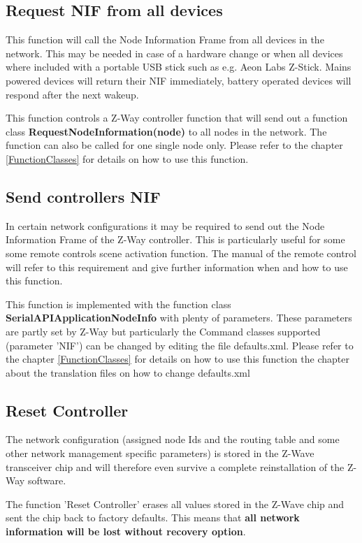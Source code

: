 \subsection{Request NIF from all devices}

This function will call the Node Information Frame from all devices in the network. 
This may be needed in case of a hardware change or when all devices 
where included with a portable USB stick such as e.g. Aeon Labs Z-Stick.  Mains powered 
devices will return their NIF immediately, battery 
operated devices will respond after the next wakeup.


This function controls a Z-Way controller function that will send out a function 
class {\bf RequestNodeInformation(node)} to all nodes in the network. 
The function can also be called for one single node only. Please refer to the 
chapter \ref{FunctionClasses} for details on how to use this function.

\subsection{Send controllers NIF}

In certain network configurations it may be required to send out the Node Information 
Frame of the Z-Way controller. This is particularly useful for some some remote 
controls scene activation function. The manual of the remote control will refer to this 
requirement and give further information when and how to use this function.

This function is implemented with the function class {\bf SerialAPIApplicationNodeInfo} 
with plenty of parameters. These parameters are partly set by Z-Way but particularly the 
Command classes supported (parameter 'NIF') can be changed by editing the file defaults.xml. 
Please refer to the chapter \ref{FunctionClasses} for details on how to use this function 
the chapter about the translation files on how to change defaults.xml

\subsection{Reset Controller}

The network configuration (assigned node Ids and the routing table and some other network 
management specific parameters) is stored in the Z-Wave 
transceiver chip and will therefore even survive a complete reinstallation of the Z-Way software.

The function 'Reset Controller' erases all values stored in the Z-Wave chip and sent the 
chip back to factory defaults. This means that \textbf{all network information will be lost 
without recovery option}.

